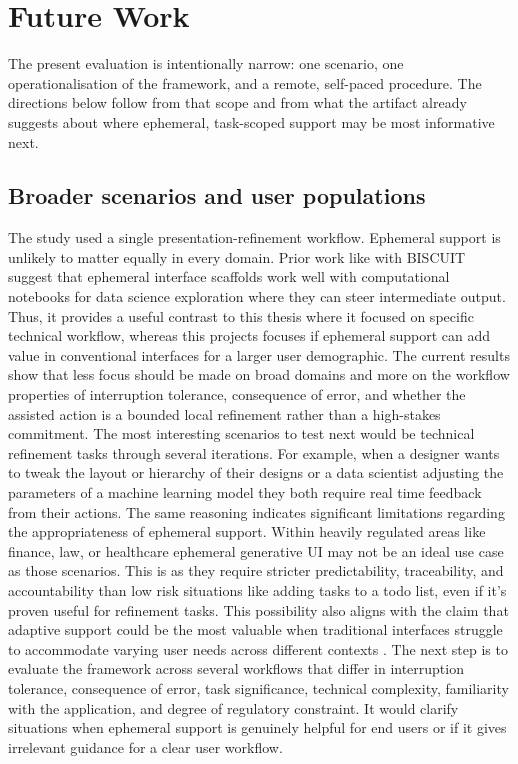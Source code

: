 \pagestyle{fancy} 
\section{Future Work}\label{sec:future-work}

The present evaluation is intentionally narrow: one scenario, one operationalisation of the framework, and a remote, self-paced procedure. The directions below follow from that scope and from what the artifact already suggests about where ephemeral, task-scoped support may be most informative next.

\subsection{Broader scenarios and user populations}

The study used a single presentation-refinement workflow. Ephemeral support is unlikely to matter equally in every domain. Prior work like with BISCUIT \parencite{Cheng2024Biscuit} suggest that ephemeral interface scaffolds work well with computational notebooks for data science exploration where they can steer intermediate output. Thus, it provides a useful contrast to this thesis where it focused on specific technical workflow, whereas this projects focuses if ephemeral support can add value in conventional interfaces for a larger user demographic. The current results show that less focus should be made on broad domains and more on the workflow properties of interruption tolerance, consequence of error, and whether the assisted action is a bounded local refinement rather than a high-stakes commitment. The most interesting scenarios to test next would be technical refinement tasks through several iterations. For example, when a designer wants to tweak the layout or hierarchy of their designs or a data scientist adjusting the parameters of a machine learning model they both require real time feedback from their actions. The same reasoning indicates significant limitations regarding the appropriateness of ephemeral support. Within heavily regulated areas like finance, law, or healthcare ephemeral generative UI may not be an ideal use case as those scenarios. This is as they require stricter predictability, traceability, and accountability than low risk situations like adding tasks to a todo list, even if it's proven useful for refinement tasks. This possibility also aligns with the claim that adaptive support could be the most valuable when traditional interfaces struggle to accommodate varying user needs across different contexts \parencite{Bieniek2024GenerativeAI,Tambi2020GenerativeBanking}. The next step is to evaluate the framework across several workflows that differ in interruption tolerance, consequence of error, task significance, technical complexity, familiarity with the application, and degree of regulatory constraint. It would clarify situations when ephemeral support is genuinely helpful for end users or if it gives irrelevant guidance for a clear user workflow.

